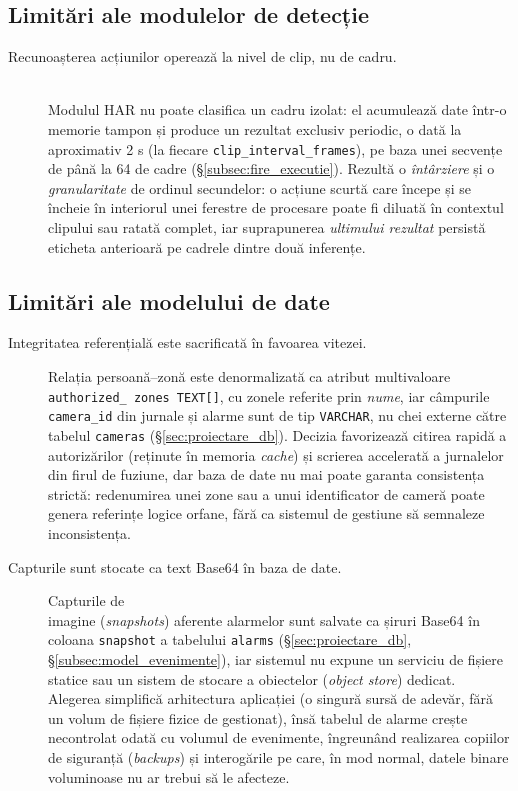 \documentclass[../../main.tex]{subfiles}
\begin{document}
\subsection{Limitări ale modulelor de detecție}

\begin{description}
	\item[Recunoașterea acțiunilor operează la nivel de clip, nu de cadru.] \hfill \\ Modulul HAR nu poate clasifica un cadru izolat: el acumulează date într-o memorie tampon și produce un rezultat exclusiv periodic, o dată la aproximativ 2 s (la fiecare \texttt{clip\_interval\_frames}), pe baza unei secvențe de până la 64 de cadre (\S\ref{subsec:fire_executie}). Rezultă o \emph{întârziere} și o \emph{granularitate} de ordinul secundelor: o acțiune scurtă care începe și se încheie în interiorul unei ferestre de procesare poate fi diluată în contextul clipului sau ratată complet, iar suprapunerea \emph{ultimului rezultat} persistă eticheta anterioară pe cadrele dintre două inferențe.
	
\end{description}

\subsection{Limitări ale modelului de date}

\begin{description}
	\item[Integritatea referențială este sacrificată în favoarea vitezei.] Relația \linebreak persoană--zonă este denormalizată ca atribut multivaloare \texttt{authorized\_ \linebreak zones TEXT[]}, cu zonele referite prin \emph{nume}, iar câmpurile \texttt{camera\_id} din jurnale și alarme sunt de tip \texttt{VARCHAR}, nu chei externe către tabelul \texttt{cameras} (\S\ref{sec:proiectare_db}). Decizia favorizează citirea rapidă a autorizărilor (reținute în memoria \textit{cache}) și scrierea accelerată a jurnalelor din firul de fuziune, dar baza de date nu mai poate garanta consistența strictă: redenumirea unei zone sau a unui identificator de cameră poate genera referințe logice orfane, fără ca sistemul de gestiune să semnaleze inconsistența.
	
	\item[Capturile sunt stocate ca text Base64 în baza de date.] Capturile de \\ imagine (\textit{snapshots}) aferente alarmelor sunt salvate ca șiruri Base64 în coloana \texttt{snapshot} a tabelului \texttt{alarms} (\S\ref{sec:proiectare_db}, \S\ref{subsec:model_evenimente}), iar sistemul nu expune un serviciu de fișiere statice sau un sistem de stocare a obiectelor (\textit{object store}) dedicat. Alegerea simplifică arhitectura aplicației (o singură sursă de adevăr, fără un volum de fișiere fizice de gestionat), însă tabelul de alarme crește necontrolat odată cu volumul de evenimente, îngreunând realizarea copiilor de siguranță (\textit{backups}) și interogările pe care, în mod normal, datele binare voluminoase nu ar trebui să le afecteze.
\end{description}
\end{document}
